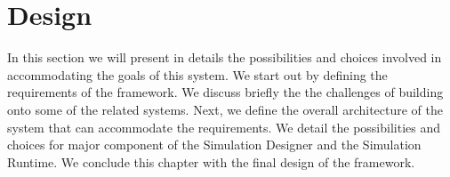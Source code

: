 \chapter{Design}\label{ch:design}
In this section we will present in details the possibilities and choices involved in accommodating the goals of this system. We start out by defining the requirements of the framework. We discuss briefly the the challenges of building onto some of the related systems. Next, we define the overall architecture of the system that can accommodate the requirements. We detail the possibilities and choices for major component of the Simulation Designer and the Simulation Runtime. We conclude this chapter with the final design of the framework.












